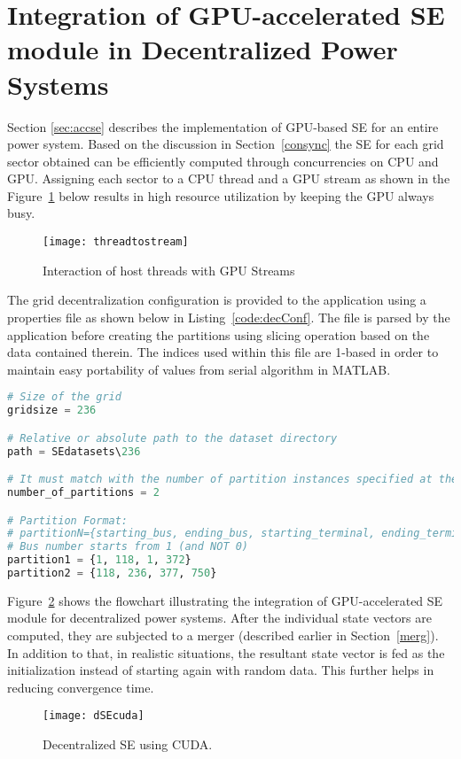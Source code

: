 \documentclass[thesis.tex]{subfiles}
\begin{document}
\section{Integration of GPU-accelerated SE module in Decentralized Power Systems}\label{sec:integrationimpl}
Section \ref{sec:accse} describes the implementation of GPU-based SE for an entire power system. Based on the discussion in Section~\ref{consync} the SE for each grid sector obtained can be efficiently computed through concurrencies on CPU and GPU. Assigning each sector to a CPU thread and a GPU stream as shown in the Figure~\ref{fig:threadtostream} below results in high resource utilization by keeping the GPU always busy. 
\begin{figure}[H]
	\centering
	\texttt{[image: threadtostream]}
	\caption{Interaction of host threads with GPU Streams}
	\label{fig:threadtostream}
\end{figure}

The grid decentralization configuration is provided to the application using a properties file as shown below in Listing~\ref{code:decConf}. The file is parsed by the application before creating the partitions using slicing operation based on the data contained therein. The indices used within this file are 1-based in order to maintain easy portability of values from serial algorithm in MATLAB.
\lstset{aboveskip=10pt,belowskip=10pt} %
\begin{lstlisting}[language=Python, caption={Grid decentralization configuration file}, captionpos=b, label={code:decConf}]
# Size of the grid
gridsize = 236

# Relative or absolute path to the dataset directory
path = SEdatasets\236

# It must match with the number of partition instances specified at the bottom
number_of_partitions = 2

# Partition Format: 
# partitionN={starting_bus, ending_bus, starting_terminal, ending_terminal} 
# Bus number starts from 1 (and NOT 0)
partition1 = {1, 118, 1, 372}
partition2 = {118, 236, 377, 750}
\end{lstlisting}
Figure~\ref{fig:dSEcuda} shows the flowchart illustrating the integration of GPU-accelerated SE module for decentralized power systems. After the individual state vectors are computed, they are subjected to a merger (described earlier in Section~\ref{merg}). In addition to that, in realistic situations, the resultant state vector is fed as the initialization instead of starting again with random data. This further helps in reducing convergence time.

\begin{figure}[H]
	\centering
	\texttt{[image: dSEcuda]}
	\caption{Decentralized SE using CUDA.}
	\label{fig:dSEcuda}
\end{figure}


\subfilebib %
\end{document}

